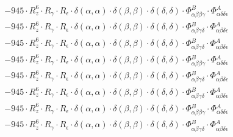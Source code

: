 \documentclass{article}
\begin{document}
\begin{subequations}
\begin{gather}
\begin{array}{c}
 \\[0.2em] 		 - 945 \cdot R_{z}^{6} \cdot R_{\gamma{}} \cdot R_{\epsilon{}} \cdot \delta{}\left(\alpha{}, \alpha{}\right) \cdot \delta{}\left(\beta{}, \beta{}\right) \cdot \delta{}\left(\delta{}, \delta{}\right) \cdot \Phi{}^{B}_{\alpha{}\beta{}\beta{}\gamma{}} \cdot \Phi{}^{A}_{\alpha{}\delta{}\delta{}\epsilon{}} 
 \\[0.2em] 		 - 945 \cdot R_{z}^{6} \cdot R_{\gamma{}} \cdot R_{\epsilon{}} \cdot \delta{}\left(\alpha{}, \alpha{}\right) \cdot \delta{}\left(\beta{}, \beta{}\right) \cdot \delta{}\left(\delta{}, \delta{}\right) \cdot \Phi{}^{B}_{\alpha{}\beta{}\gamma{}\delta{}} \cdot \Phi{}^{A}_{\alpha{}\beta{}\delta{}\epsilon{}} 
 \\[0.2em] 		 - 945 \cdot R_{z}^{6} \cdot R_{\gamma{}} \cdot R_{\epsilon{}} \cdot \delta{}\left(\alpha{}, \alpha{}\right) \cdot \delta{}\left(\beta{}, \beta{}\right) \cdot \delta{}\left(\delta{}, \delta{}\right) \cdot \Phi{}^{B}_{\alpha{}\beta{}\gamma{}\delta{}} \cdot \Phi{}^{A}_{\alpha{}\beta{}\delta{}\epsilon{}} 
 \\[0.2em] 		 - 945 \cdot R_{z}^{6} \cdot R_{\gamma{}} \cdot R_{\epsilon{}} \cdot \delta{}\left(\alpha{}, \alpha{}\right) \cdot \delta{}\left(\beta{}, \beta{}\right) \cdot \delta{}\left(\delta{}, \delta{}\right) \cdot \Phi{}^{B}_{\alpha{}\beta{}\beta{}\gamma{}} \cdot \Phi{}^{A}_{\alpha{}\delta{}\delta{}\epsilon{}} 
 \\[0.2em] 		 - 945 \cdot R_{z}^{6} \cdot R_{\gamma{}} \cdot R_{\epsilon{}} \cdot \delta{}\left(\alpha{}, \alpha{}\right) \cdot \delta{}\left(\beta{}, \beta{}\right) \cdot \delta{}\left(\delta{}, \delta{}\right) \cdot \Phi{}^{B}_{\alpha{}\beta{}\gamma{}\delta{}} \cdot \Phi{}^{A}_{\alpha{}\beta{}\delta{}\epsilon{}} 
 \\[0.2em] 		 - 945 \cdot R_{z}^{6} \cdot R_{\gamma{}} \cdot R_{\epsilon{}} \cdot \delta{}\left(\alpha{}, \alpha{}\right) \cdot \delta{}\left(\beta{}, \beta{}\right) \cdot \delta{}\left(\delta{}, \delta{}\right) \cdot \Phi{}^{B}_{\alpha{}\beta{}\gamma{}\delta{}} \cdot \Phi{}^{A}_{\alpha{}\beta{}\delta{}\epsilon{}} 
 \\[0.2em] 		 - 945 \cdot R_{z}^{6} \cdot R_{\gamma{}} \cdot R_{\epsilon{}} \cdot \delta{}\left(\alpha{}, \alpha{}\right) \cdot \delta{}\left(\beta{}, \beta{}\right) \cdot \delta{}\left(\delta{}, \delta{}\right) \cdot \Phi{}^{B}_{\alpha{}\beta{}\beta{}\gamma{}} \cdot \Phi{}^{A}_{\alpha{}\delta{}\delta{}\epsilon{}} 
 \\[0.2em] 		 - 945 \cdot R_{z}^{6} \cdot R_{\gamma{}} \cdot R_{\epsilon{}} \cdot \delta{}\left(\alpha{}, \alpha{}\right) \cdot \delta{}\left(\beta{}, \beta{}\right) \cdot \delta{}\left(\delta{}, \delta{}\right) \cdot \Phi{}^{B}_{\alpha{}\beta{}\gamma{}\delta{}} \cdot \Phi{}^{A}_{\alpha{}\beta{}\delta{}\epsilon{}} 

\end{array}
\end{gather}
\end{subequations}
\end{document}
